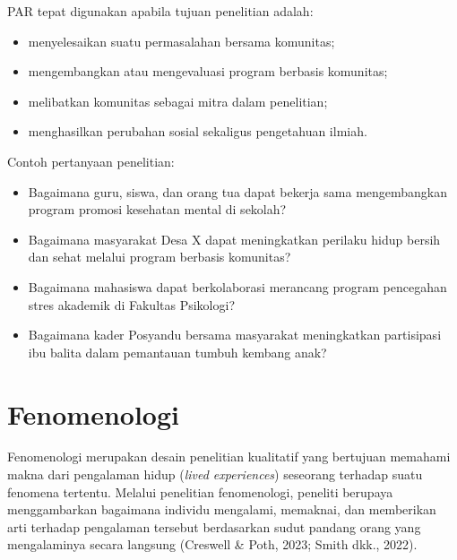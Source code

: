 \documentclass[
  indonesian,
  letterpaper,
  DIV=11,
  numbers=noendperiod]{scrreprt}
\providecommand{\tightlist}{%
  \setlength{\itemsep}{0pt}\setlength{\parskip}{0pt}}
\begin{document}
\begin{tcolorbox}[enhanced jigsaw, colframe=quarto-callout-tip-color-frame, toptitle=1mm, breakable, leftrule=.75mm, arc=.35mm, toprule=.15mm, colback=white, colbacktitle=quarto-callout-tip-color!10!white, bottomtitle=1mm, bottomrule=.15mm, titlerule=0mm, title={Kapan menggunakan PAR?}, coltitle=black, left=2mm, opacitybacktitle=0.6, opacityback=0, rightrule=.15mm]

PAR tepat digunakan apabila tujuan penelitian adalah:

\begin{itemize}
\tightlist
\item
  menyelesaikan suatu permasalahan bersama komunitas;
\item
  mengembangkan atau mengevaluasi program berbasis komunitas;
\item
  melibatkan komunitas sebagai mitra dalam penelitian;
\item
  menghasilkan perubahan sosial sekaligus pengetahuan ilmiah.
\end{itemize}

Contoh pertanyaan penelitian:

\begin{itemize}
\tightlist
\item
  Bagaimana guru, siswa, dan orang tua dapat bekerja sama mengembangkan
  program promosi kesehatan mental di sekolah?
\item
  Bagaimana masyarakat Desa X dapat meningkatkan perilaku hidup bersih
  dan sehat melalui program berbasis komunitas?
\item
  Bagaimana mahasiswa dapat berkolaborasi merancang program pencegahan
  stres akademik di Fakultas Psikologi?
\item
  Bagaimana kader Posyandu bersama masyarakat meningkatkan partisipasi
  ibu balita dalam pemantauan tumbuh kembang anak?
\end{itemize}

\end{tcolorbox}

\section{Fenomenologi}\label{fenomenologi}

Fenomenologi merupakan desain penelitian kualitatif yang bertujuan
memahami makna dari pengalaman hidup (\emph{lived experiences})
seseorang terhadap suatu fenomena tertentu. Melalui penelitian
fenomenologi, peneliti berupaya menggambarkan bagaimana individu
mengalami, memaknai, dan memberikan arti terhadap pengalaman tersebut
berdasarkan sudut pandang orang yang mengalaminya secara langsung
(Creswell \& Poth, 2023; Smith dkk., 2022).
\end{document}
